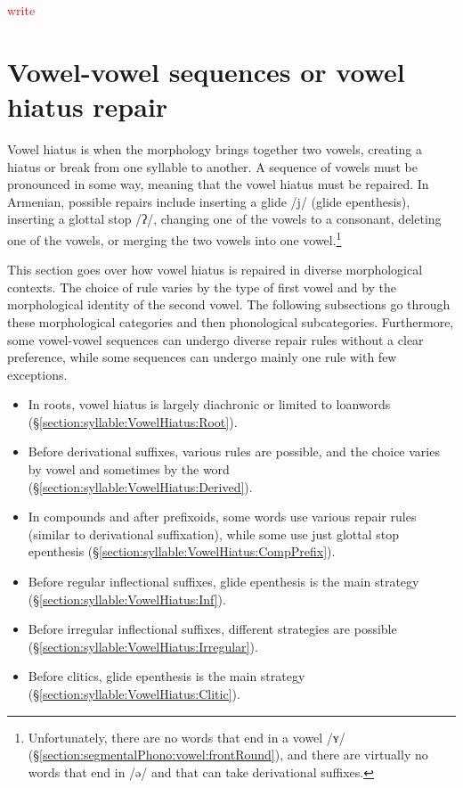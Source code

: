 {	\textcolor{red}{write}
	
	
	\section{Vowel-vowel sequences or vowel hiatus repair}\label{section:syllable:VowelHiatus}
	Vowel hiatus is when the morphology brings together two vowels, creating a hiatus or break from one syllable to another. A sequence of vowels must be pronounced in some way, meaning that the vowel hiatus must be repaired. In Armenian, possible repairs include  inserting a glide /j/ (glide epenthesis), inserting a glottal stop /ʔ/, changing one of the vowels to a consonant, deleting one of the vowels, or merging the two vowels into one vowel.\footnote{Unfortunately, there are no words that end in a vowel /ʏ/ (\S\ref{section:segmentalPhono:vowel:frontRound}), and there are virtually no words that end in /ə/ and that can take derivational suffixes.  
	}
	
	This section goes over how vowel hiatus is repaired in diverse morphological contexts. The choice of rule varies by the type of first vowel and by the morphological identity of the second vowel. The following subsections go through these morphological categories and then phonological subcategories. Furthermore, some vowel-vowel sequences can undergo diverse repair rules without a clear preference, while some sequences can undergo mainly one rule with few exceptions.  
	
	\begin{itemize}[noitemsep,topsep=0pt]
		\item In roots, vowel hiatus is largely diachronic or limited to loanwords (\S\ref{section:syllable:VowelHiatus:Root}).
		\item  Before derivational suffixes, various rules are possible, and the choice varies by vowel and sometimes by the word (\S\ref{section:syllable:VowelHiatus:Derived}).
		\item In compounds and after prefixoids, some words use various repair rules (similar to derivational suffixation), while some use just glottal stop epenthesis (\S\ref{section:syllable:VowelHiatus:CompPrefix}). 
		\item  Before regular inflectional suffixes, glide epenthesis is the main strategy  (\S\ref{section:syllable:VowelHiatus:Inf}).
		\item  Before irregular inflectional suffixes, different strategies are possible  (\S\ref{section:syllable:VowelHiatus:Irregular}).
		\item  Before clitics, glide epenthesis is the main strategy  (\S\ref{section:syllable:VowelHiatus:Clitic}).
	\end{itemize}
	
}
